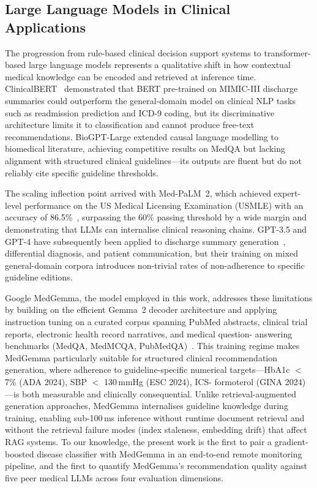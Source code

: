 \documentclass[journal]{IEEEtran}
\begin{document}
\subsection{Large Language Models in Clinical Applications}

The progression from rule-based clinical decision support systems to
transformer-based large language models represents a qualitative shift in
how contextual medical knowledge can be encoded and retrieved at inference
time. ClinicalBERT~\cite{esteva2021} demonstrated that BERT pre-trained on
MIMIC-III discharge summaries could outperform the general-domain model on
clinical NLP tasks such as readmission prediction and ICD-9 coding, but its
discriminative architecture limits it to classification and cannot produce
free-text recommendations. BioGPT-Large extended causal language modelling
to biomedical literature, achieving competitive results on MedQA but lacking
alignment with structured clinical guidelines—its outputs are fluent but do
not reliably cite specific guideline thresholds.

The scaling inflection point arrived with Med-PaLM~2, which achieved expert-
level performance on the US Medical Licensing Examination (USMLE) with an
accuracy of 86.5\%~\cite{singhal2023}, surpassing the 60\% passing threshold
by a wide margin and demonstrating that LLMs can internalise clinical
reasoning chains. GPT-3.5 and GPT-4 have subsequently been applied to
discharge summary generation~\cite{patel2023}, differential diagnosis, and
patient communication, but their training on mixed general-domain corpora
introduces non-trivial rates of non-adherence to specific guideline editions.

Google MedGemma, the model employed in this work, addresses these limitations
by building on the efficient Gemma~2 decoder architecture and applying
instruction tuning on a curated corpus spanning PubMed abstracts, clinical
trial reports, electronic health record narratives, and medical question-
answering benchmarks (MedQA, MedMCQA, PubMedQA)~\cite{medgemma2024}. This
training regime makes MedGemma particularly suitable for structured clinical
recommendation generation, where adherence to guideline-specific numerical
targets—HbA1c $<$ 7\% (ADA 2024), SBP $<$ 130\,mmHg (ESC 2024), ICS-
formoterol (GINA 2024)—is both measurable and clinically consequential.
Unlike retrieval-augmented generation approaches, MedGemma internalises
guideline knowledge during training, enabling sub-100\,ms inference without
runtime document retrieval and without the retrieval failure modes (index
staleness, embedding drift) that affect RAG systems. To our knowledge, the
present work is the first to pair a gradient-boosted disease classifier with
MedGemma in an end-to-end remote monitoring pipeline, and the first to
quantify MedGemma's recommendation quality against five peer medical LLMs
across four evaluation dimensions.
\end{document}
